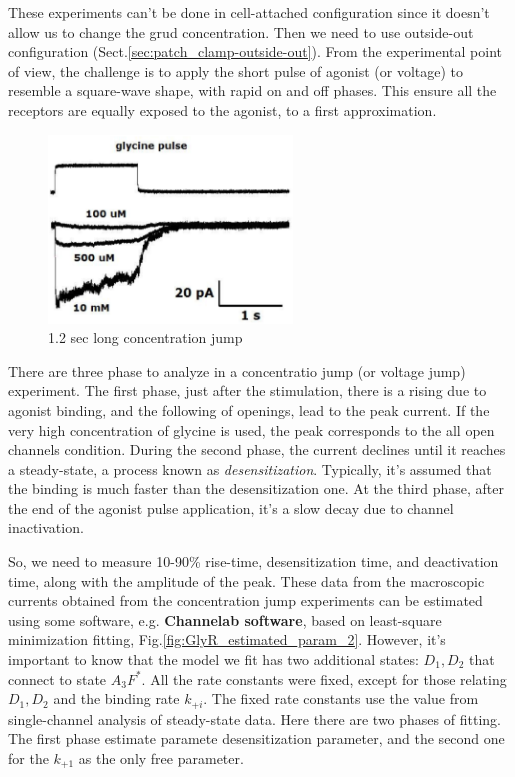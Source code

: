 These experiments can't be done in cell-attached configuration since it doesn't
allow us to change the grud concentration. Then we need to use outside-out
configuration (Sect.\ref{sec:patch_clamp-outside-out}). From the experimental
point of view, the challenge is to apply the short pulse of agonist (or voltage)
to resemble a square-wave shape, with rapid on and off phases. This ensure all
the receptors are equally exposed to the agonist, to a first approximation.

\begin{figure}[hbt]
 \centerline{\includegraphics[height=5cm, angle=0]{./images/glycine_pulse.eps}}
\caption{1.2 sec long concentration jump}
\label{fig:glycine_pulse}
\end{figure}

There are three phase to analyze in a concentratio jump (or voltage jump)
experiment. The first phase, just after the stimulation, there is a rising due
to agonist binding, and the following of openings, lead to the peak current.
If the very high concentration of glycine is used, the peak corresponds to the
all open channels condition. During the second phase, the current declines until
it reaches a steady-state, a process known as {\it desensitization}. Typically,
it's assumed that the binding is much faster than the desensitization one. At
the third phase, after the end of the agonist pulse application, it's a slow decay
due to channel inactivation.

So, we need to measure 10-90\% rise-time, desensitization time, and deactivation
time, along with the amplitude of the peak. These data from the macroscopic
currents obtained from the concentration jump experiments can be estimated using
some software, e.g. {\bf Channelab software}, based on least-square minimization
fitting, Fig.\ref{fig:GlyR_estimated_param_2}. However, it's important to know
that the model we fit has two additional states: $D_1, D_2$ that connect to
state $A_3F^*$. All the rate constants were fixed, except for those relating
$D_1, D_2$ and the binding rate $k_{+i}$. The fixed rate constants use the value
from single-channel analysis of steady-state data. Here there are two phases of
fitting. The first phase estimate paramete desensitization parameter, and the
second one for the $k_{+1}$ as the only free parameter.

